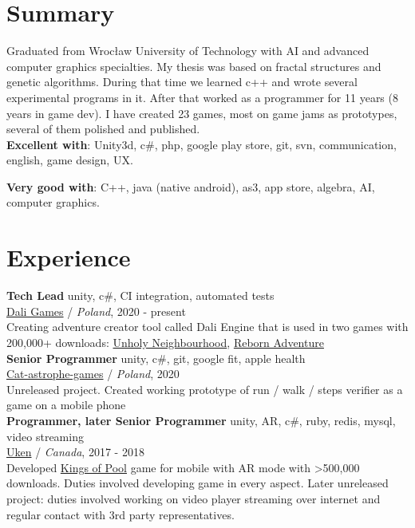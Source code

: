 \documentclass[12pt,a4paper]{article}
\begin{document}
\begin{multicols}{2}

\centering
\section*{Summary}
\justifying

	Graduated from Wrocław University of Technology with AI and advanced computer graphics specialties. My thesis was based on fractal structures and genetic algorithms. During that time we learned c++ and wrote several experimental programs in it. After that worked as a programmer for 11 years (8 years in game dev). I have created 23 games, most on game jams as prototypes, several of them polished and published.
	\\

	\textbf{Excellent with}: Unity3d, c\#, php, google play store, git, svn, communication, english, game design, UX.

	\textbf{Very good with}: C++, java (native android), as3, app store, algebra, AI, computer graphics.

\centering
\section*{Experience }
\justifying
	 {\large \textbf{Tech Lead}}  \hfill \textcolor{techColor}{unity, c\#, CI integration, automated tests} \\
	{\href{https://dali.games/}{Dali Games}}  / \textit{Poland}, 2020 - present  \\
	Creating adventure creator tool called Dali Engine that is used in two games with 200,000+ downloads: {\href{https://play.google.com/store/apps/details?id=games.dali.adventure.neighborhood.unholy}{Unholy Neighbourhood}}, {\href{https://play.google.com/store/apps/details?id=games.dali.adventure.reborn}{Reborn Adventure}} \\

	{\large \textbf{Senior Programmer}} \hfill \textcolor{techColor}{unity, c\#, git, google fit, apple health} \\
	{\href{https://cat-astrophe-games.com/}{Cat-astrophe-games}}  / \textit{Poland}, 2020 \\
	Unreleased project. Created working prototype of run / walk / steps verifier as a game on a mobile phone   \\

	{\large \textbf{Programmer, later Senior Programmer}} \hfill \textcolor{techColor}{unity, AR, c\#, ruby, redis, mysql, video streaming} \\
	{\href{https://www.uken.com/}{Uken}}  / \textit{Canada}, 2017 - 2018 \\
	Developed {\href{https://play.google.com/store/apps/details?id=com.uken.pool}{Kings of Pool}} game for mobile with AR mode with \textgreater 500,000 downloads. Duties involved developing game in every aspect. Later unreleased project: duties involved working on video player streaming over internet and regular contact with 3rd party representatives. \\


\end{multicols}
\end{document}
